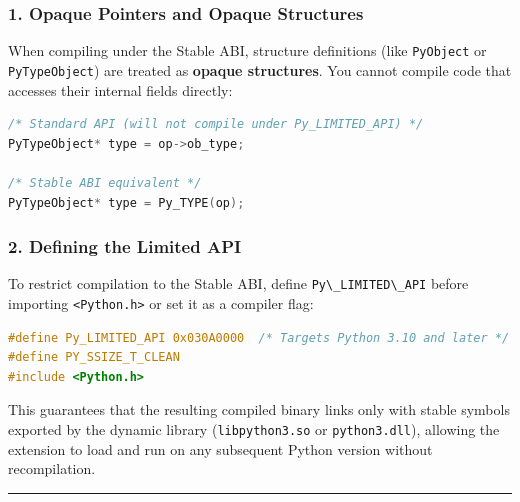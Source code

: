 \hypertarget{opaque-pointers-and-opaque-structures}{%
\subsubsection{1. Opaque Pointers and Opaque
Structures}\label{opaque-pointers-and-opaque-structures}}

When compiling under the Stable ABI, structure definitions (like
\passthrough{\lstinline!PyObject!} or
\passthrough{\lstinline!PyTypeObject!}) are treated as \textbf{opaque
structures}. You cannot compile code that accesses their internal fields
directly:

\begin{lstlisting}[language=C]
/* Standard API (will not compile under Py_LIMITED_API) */
PyTypeObject* type = op->ob_type;

/* Stable ABI equivalent */
PyTypeObject* type = Py_TYPE(op);
\end{lstlisting}

\hypertarget{defining-the-limited-api}{%
\subsubsection{2. Defining the Limited
API}\label{defining-the-limited-api}}

To restrict compilation to the Stable ABI, define
\passthrough{\lstinline!Py\_LIMITED\_API!} before importing
\passthrough{\lstinline!<Python.h>!} or set it as a compiler flag:

\begin{lstlisting}[language=C]
#define Py_LIMITED_API 0x030A0000  /* Targets Python 3.10 and later */
#define PY_SSIZE_T_CLEAN
#include <Python.h>
\end{lstlisting}

This guarantees that the resulting compiled binary links only with
stable symbols exported by the dynamic library
(\passthrough{\lstinline!libpython3.so!} or
\passthrough{\lstinline!python3.dll!}), allowing the extension to load
and run on any subsequent Python version without recompilation.

\begin{center}\rule{0.5\linewidth}{0.5pt}\end{center}
